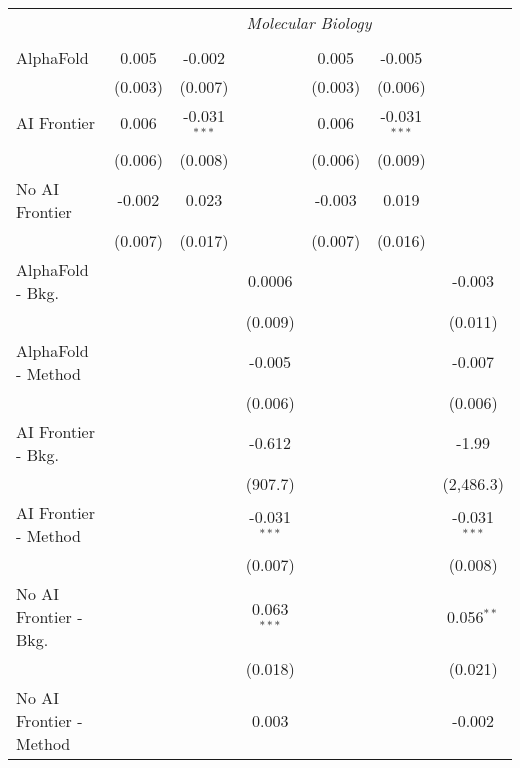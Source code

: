 \begin{tabular}{lcccccc}
 & \multicolumn{6}{c}{\textit{Molecular Biology}} \\ \\
   AlphaFold               & 0.005   & -0.002         &                & 0.005   & -0.005         &   \\   
                           & (0.003) & (0.007)        &                & (0.003) & (0.006)        &   \\   
   AI Frontier             & 0.006   & -0.031$^{***}$ &                & 0.006   & -0.031$^{***}$ &   \\   
                           & (0.006) & (0.008)        &                & (0.006) & (0.009)        &   \\   
   No AI Frontier          & -0.002  & 0.023          &                & -0.003  & 0.019          &   \\   
                           & (0.007) & (0.017)        &                & (0.007) & (0.016)        &   \\   
   AlphaFold - Bkg.        &         &                & 0.0006         &         &                & -0.003\\   
                           &         &                & (0.009)        &         &                & (0.011)\\   
   AlphaFold - Method      &         &                & -0.005         &         &                & -0.007\\   
                           &         &                & (0.006)        &         &                & (0.006)\\   
   AI Frontier - Bkg.      &         &                & -0.612         &         &                & -1.99\\   
                           &         &                & (907.7)        &         &                & (2,486.3)\\   
   AI Frontier - Method    &         &                & -0.031$^{***}$ &         &                & -0.031$^{***}$\\   
                           &         &                & (0.007)        &         &                & (0.008)\\   
   No AI Frontier - Bkg.   &         &                & 0.063$^{***}$  &         &                & 0.056$^{**}$\\   
                           &         &                & (0.018)        &         &                & (0.021)\\   
   No AI Frontier - Method &         &                & 0.003          &         &                & -0.002\\   

\end{tabular}
